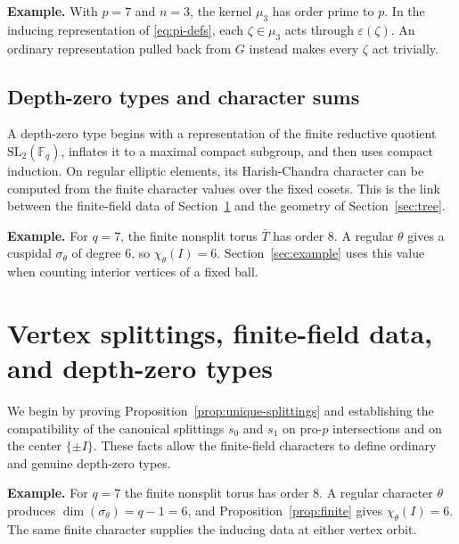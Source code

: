 \documentclass[12pt, letterpaper]{article}
\numberwithin{equation}{section}
\theoremstyle{definition}
\theoremstyle{remark}
\newcommand{\kk}{\mathbb{F}_q}
\newcommand{\Gbar}{\mathrm{SL}_2(\kk)}
\begin{document}
\noindent\textbf{Example.} With $p=7$ and $n=3$, the kernel $\mu_3$ has order prime to $p$. In the inducing representation of \eqref{eq:pi-defs}, each $\zeta\in\mu_3$ acts through $\varepsilon(\zeta)$. An ordinary representation pulled back from $G$ instead makes every $\zeta$ act trivially.

\subsection{Depth-zero types and character sums}

A depth-zero type begins with a representation of the finite reductive quotient $\Gbar$, inflates it to a maximal compact subgroup, and then uses compact induction. On regular elliptic elements, its Harish-Chandra character can be computed from the finite character values over the fixed cosets. This is the link between the finite-field data of Section~\ref{sec:types} and the geometry of Section~\ref{sec:tree}.

\noindent\textbf{Example.} For $q=7$, the finite nonsplit torus $\bar T$ has order $8$. A regular $\theta$ gives a cuspidal $\sigma_\theta$ of degree $6$, so $\chi_\theta(I)=6$. Section~\ref{sec:example} uses this value when counting interior vertices of a fixed ball.

\section{Vertex splittings, finite-field data, and depth-zero types}\label{sec:types}

We begin by proving Proposition~\ref{prop:unique-splittings} and establishing the compatibility of the canonical splittings $s_0$ and $s_1$ on pro-$p$ intersections and on the center $\{\pm I\}$. These facts allow the finite-field characters to define ordinary and genuine depth-zero types.

\noindent\textbf{Example.} For $q=7$ the finite nonsplit torus has order $8$. A regular character $\theta$ produces $\dim(\sigma_\theta)=q-1=6$, and Proposition~\ref{prop:finite} gives $\chi_\theta(I)=6$. The same finite character supplies the inducing data at either vertex orbit.
\end{document}
